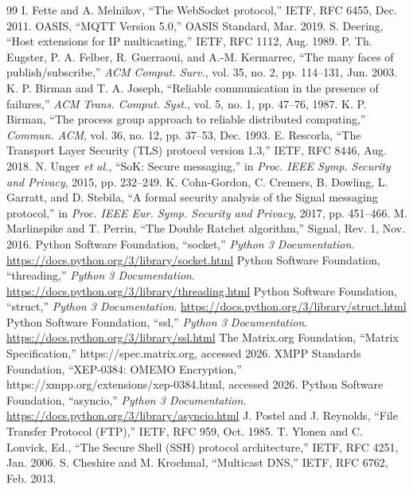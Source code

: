 \documentclass[conference]{IEEEtran}
\begin{document}
\begin{thebibliography}{99}
 I. Fette and A. Melnikov, ``The WebSocket protocol,'' IETF, RFC 6455, Dec. 2011.
 OASIS, ``MQTT Version 5.0,'' OASIS Standard, Mar. 2019.
 S. Deering, ``Host extensions for IP multicasting,'' IETF, RFC 1112, Aug. 1989.
 P. Th. Eugster, P. A. Felber, R. Guerraoui, and A.-M. Kermarrec, ``The many faces of publish/subscribe,'' \emph{ACM Comput. Surv.}, vol. 35, no. 2, pp. 114--131, Jun. 2003.
 K. P. Birman and T. A. Joseph, ``Reliable communication in the presence of failures,'' \emph{ACM Trans. Comput. Syst.}, vol. 5, no. 1, pp. 47--76, 1987.
 K. P. Birman, ``The process group approach to reliable distributed computing,'' \emph{Commun. ACM}, vol. 36, no. 12, pp. 37--53, Dec. 1993.
 E. Rescorla, ``The Transport Layer Security (TLS) protocol version 1.3,'' IETF, RFC 8446, Aug. 2018.
 N. Unger \emph{et al.}, ``SoK: Secure messaging,'' in \emph{Proc. IEEE Symp. Security and Privacy}, 2015, pp. 232--249.
 K. Cohn-Gordon, C. Cremers, B. Dowling, L. Garratt, and D. Stebila, ``A formal security analysis of the Signal messaging protocol,'' in \emph{Proc. IEEE Eur. Symp. Security and Privacy}, 2017, pp. 451--466.
 M. Marlinspike and T. Perrin, ``The Double Ratchet algorithm,'' Signal, Rev. 1, Nov. 2016.
 Python Software Foundation, ``socket,'' \emph{Python 3 Documentation}. \url{https://docs.python.org/3/library/socket.html}
 Python Software Foundation, ``threading,'' \emph{Python 3 Documentation}. \url{https://docs.python.org/3/library/threading.html}
 Python Software Foundation, ``struct,'' \emph{Python 3 Documentation}. \url{https://docs.python.org/3/library/struct.html}
 Python Software Foundation, ``ssl,'' \emph{Python 3 Documentation}. \url{https://docs.python.org/3/library/ssl.html}
 The Matrix.org Foundation, ``Matrix Specification,'' https://spec.matrix.org, accessed 2026.
 XMPP Standards Foundation, ``XEP-0384: OMEMO Encryption,'' https://xmpp.org/extensions/xep-0384.html, accessed 2026.
 Python Software Foundation, ``asyncio,'' \emph{Python 3 Documentation}. \url{https://docs.python.org/3/library/asyncio.html}
 J. Postel and J. Reynolds, ``File Transfer Protocol (FTP),'' IETF, RFC 959, Oct. 1985.
 T. Ylonen and C. Lonvick, Ed., ``The Secure Shell (SSH) protocol architecture,'' IETF, RFC 4251, Jan. 2006.
 S. Cheshire and M. Krochmal, ``Multicast DNS,'' IETF, RFC 6762, Feb. 2013.

\end{thebibliography}
\end{document}
